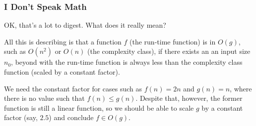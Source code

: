 \documentclass[aspectratio=169]{beamer}
\begin{document}
\begin{frame}[fragile]
  \frametitle{I Don't Speak Math}

  OK, that's a lot to digest. What does it really mean?

  \vspace{\fill}

  All this is describing is that a function
  $f$ (the run-time function) is in $O(g)$, such as $O(n^2)$ or $O(n)$ (the 
  complexity class), if there exists an an input size $n_0$, beyond with the
  run-time function is always less than the complexity class function (scaled by
  a constant factor).

  \vspace{\fill}

  We need the constant factor for cases such as $f(n) = 2n$ and $g(n) = n$, where
  there is no value such that $f(n) \leq g(n)$. Despite that, however, the former
  function is still a linear function, so we should be able to scale $g$
  by a constant factor (say, $2.5$) and conclude $f \in O(g)$. 
\end{frame}


\end{document}
